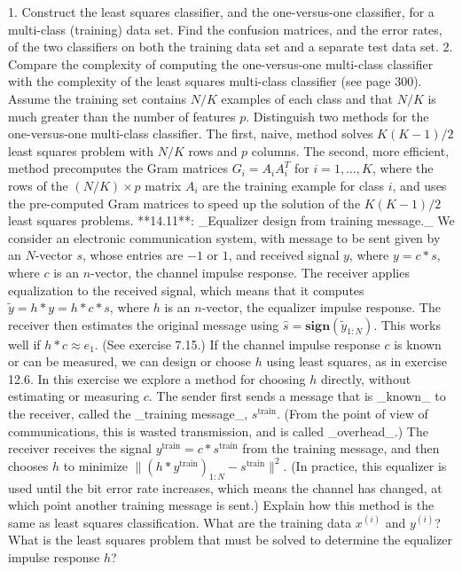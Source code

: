 1. Construct the least squares classifier, and the one-versus-one classifier, for a multi-class (training) data set. Find the confusion matrices, and the error rates, of the two classifiers on both the training data set and a separate test data set.
2. Compare the complexity of computing the one-versus-one multi-class classifier with the complexity of the least squares multi-class classifier (see page 300). Assume the training set contains \(N/K\) examples of each class and that \(N/K\) is much greater than the number of features \(p\). Distinguish two methods for the one-versus-one multi-class classifier. The first, naive, method solves \(K(K-1)/2\) least squares problem with \(N/K\) rows and \(p\) columns. The second, more efficient, method precomputes the Gram matrices \(G_{i}=A_{i}A_{i}^{T}\) for \(i=1,\ldots,K\), where the rows of the \((N/K)\times p\) matrix \(A_{i}\) are the training example for class \(i\), and uses the pre-computed Gram matrices to speed up the solution of the \(K(K-1)/2\) least squares problems.
**14.11**: _Equalizer design from training message._ We consider an electronic communication system, with message to be sent given by an \(N\)-vector \(s\), whose entries are \(-1\) or \(1\), and received signal \(y\), where \(y=c*s\), where \(c\) is an \(n\)-vector, the channel impulse response. The receiver applies equalization to the received signal, which means that it computes \(\tilde{y}=h*y=h*c*s\), where \(h\) is an \(n\)-vector, the equalizer impulse response. The receiver then estimates the original message using \(\hat{s}=\mathbf{sign}(\tilde{y}_{1:N})\). This works well if \(h*c\approx e_{1}\). (See exercise 7.15.) If the channel impulse response \(c\) is known or can be measured, we can design or choose \(h\) using least squares, as in exercise 12.6. In this exercise we explore a method for choosing \(h\) directly, without estimating or measuring \(c\). The sender first sends a message that is _known_ to the receiver, called the _training message_, \(s^{\text{train}}\). (From the point of view of communications, this is wasted transmission, and is called _overhead_.) The receiver receives the signal \(y^{\text{train}}=c*s^{\text{train}}\) from the training message, and then chooses \(h\) to minimize \(\|(h*y^{\text{train}})_{1:N}-s^{\text{train}}\|^{2}\). (In practice, this equalizer is used until the bit error rate increases, which means the channel has changed, at which point another training message is sent.) Explain how this method is the same as least squares classification. What are the training data \(x^{(i)}\) and \(y^{(i)}\)? What is the least squares problem that must be solved to determine the equalizer impulse response \(h\)?
